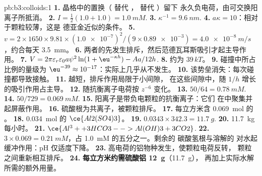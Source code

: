 \begin{solution}{pb:b3:colloids:1}
\textbf{1.} 晶格中的置换（ 替代 ， 替代 ）留下
永久负电荷，由可交换阳离子所抵消。
\textbf{2.} $I = \frac12(1.0 + 1.0) = \qty{1.0}{mM}$.
\textbf{3.} $\kappa^{-1} = \qty{9.6}{nm}$.
\textbf{4.} $a\kappa = 10$：相对于颗粒较薄，这是
德亚金近似的条件。
\textbf{5.} $v = 2 \times 1650 \times 9.81 \times (\num{1.0e-7})^2/(9 \times \num{0.89e-3}) = \qty{4.0e-8}{m/s}$，约合每天 \qty{3.5}{mm}。
\textbf{6.} 两者的先发生排斥，然后范德瓦耳斯吸引才起主导作用。
\textbf{7.} $V = 2\pi\varepsilon_r\varepsilon_0a\psi^2\ln(1 + \eu^{-\kappa h}) - Aa/12h$.
\textbf{8.} 约为 $39\,kT$。
\textbf{9.} 碰撞中所占比例的量级为 $\eu^{-39} \approx 10^{-17}$：实际上几乎从不发生。
\textbf{10.} 该势垒消失：每次碰撞都导致接触。
\textbf{11.} 越短，排斥作用局限于小间隙，
在这些间隙中，随 $1/h$ 增长的吸引作用占主导。
\textbf{12.} 随抗衡离子电荷按 $z^{-6}$ 变化。
\textbf{13.} $50/64 = \qty{0.78}{mM}$.
\textbf{14.} $50/729 = \qty{0.069}{mM}$.
\textbf{15.} 阳离子是带负电颗粒的抗衡离子：它们
在中聚集并起屏蔽作用。
\textbf{16.} 硫酸根为共离子，被颗粒排斥。
\textbf{17.} 每立方米含 \qty{0.069}{mol} 的 。
\textbf{18.} \qty{0.034}{mol} 的 $\ce{Al2(SO4)3}$。
\textbf{19.} $0.0343 \times 342.3 = \qty{11.7}{g}$.
\textbf{20.} \qty{11.7}{kg} 每小时。
\textbf{21.} $\ce{Al^3+ + 3 HCO3- -> Al(OH)3 + 3 CO2}$.
\textbf{22.} $3 \times 0.069 = \qty{0.21}{mM}$，占 \qty{1.0}{mM} 的五分之一。剩余的
碳酸氢根与溶解的  对水起缓冲作用：pH
仅适度下降。
\textbf{23.} 高电荷的铝物种发生，使颗粒电荷反转，
颗粒之间重新相互排斥。
\textbf{24.} \textbf{每立方米约需硫酸铝 \qty{12}{g}}（\qty{11.7}{g}），
再加上实际水解所需的额外用量。
\end{solution}

